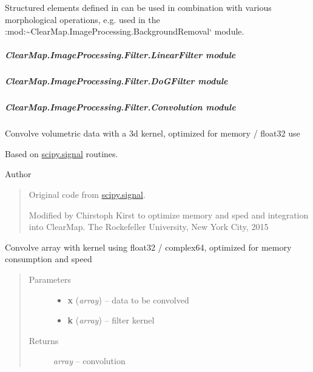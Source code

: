 \documentclass[letterpaper,10pt,english]{sphinxmanual}
\begin{document}
Structured elements defined in
 can be used in
combination with various morphological operations, e.g. used in the
:mod:\textasciitilde{}ClearMap.ImageProcessing.BackgroundRemoval{}` module.


\subparagraph{ClearMap.ImageProcessing.Filter.LinearFilter module}
\label{api/ClearMap.ImageProcessing.Filter:clearmap-imageprocessing-filter-linearfilter-module}

\subparagraph{ClearMap.ImageProcessing.Filter.DoGFilter module}
\label{api/ClearMap.ImageProcessing.Filter:clearmap-imageprocessing-filter-dogfilter-module}

\subparagraph{ClearMap.ImageProcessing.Filter.Convolution module}
\label{api/ClearMap.ImageProcessing.Filter:module-ClearMap.ImageProcessing.Filter.Convolution}\label{api/ClearMap.ImageProcessing.Filter:clearmap-imageprocessing-filter-convolution-module}
Convolve volumetric data with a 3d kernel, optimized for memory / float32 use

Based on \href{http://docs.scipy.org/doc/scipy/reference/signal.html}{scipy.signal}
routines.

Author
\begin{quote}

Original code from \href{http://docs.scipy.org/doc/scipy/reference/signal.html}{scipy.signal}.

Modified by Chirstoph Kirst to optimize memory and sped and integration into ClearMap.
The Rockefeller University, New York City, 2015
\end{quote}

\begin{fulllineitems}
\label{api/ClearMap.ImageProcessing.Filter:ClearMap.ImageProcessing.Filter.Convolution.convolve}
Convolve array with kernel using float32 / complex64, optimized for memory consumption and speed
\begin{quote}\begin{description}
\item[{Parameters}] \leavevmode\begin{itemize}
\item {} 
\textbf{x} (\emph{array}) --
data to be convolved

\item {} 
\textbf{k} (\emph{array}) --
filter kernel

\end{itemize}

\item[{Returns}] \leavevmode
\emph{array} --
convolution

\end{description}\end{quote}

\end{fulllineitems}
\end{document}
